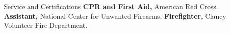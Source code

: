 \begin{rubric}{Service and Certifications}
\entry*[2023] \textbf{CPR and First Aid,} American Red Cross.
\entry*[2018--2020] \textbf{Assistant,} National Center for Unwanted Firearms.
\entry*[2015--2017] \textbf{Firefighter,} Clancy Volunteer Fire Department.
\end{rubric}
